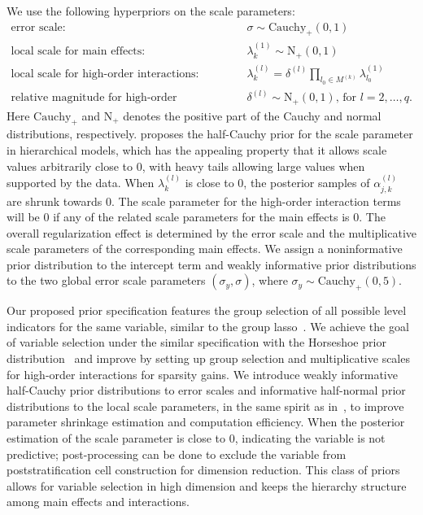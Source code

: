 \documentclass[11pt]{article}
\numberwithin{figure}{section}
\numberwithin{table}{section}
\numberwithin{equation}{section}
\begin{document}
We use the following hyperpriors on the scale parameters: \begin{align}
  \label{main} \nonumber  \mbox{error scale: }&\sigma \sim
  \textrm{Cauchy}_{+}(0,1) \\ \nonumber \mbox{local scale for main effects: } &
  \lambda_k^{(1)} \sim  \textrm{N}_{+}(0,1)\\ \mbox{local scale for high-order
  interactions: } & \lambda^{(l)}_k=\delta^{(l)}\prod_{l_0\in
  M^{(k)}}\lambda^{(1)}_{l_0} \\ \nonumber  \mbox{relative magnitude for
  high-order interactions: }&\delta^{(l)}  \sim   \textrm{N}_{+}(0,1) \mbox{,
  for } l=2,\dots, q.  \end{align} Here $\textrm{Cauchy}_{+}$ and
  $\textrm{N}_{+}$ denotes the positive part of the Cauchy and normal
  distributions, respectively.  \cite{gelman06-prior} proposes the half-Cauchy
  prior for the scale parameter in hierarchical models, which has the appealing
  property that it allows scale values arbitrarily close to 0, with heavy tails
  allowing large values when supported by the data. When $\lambda_k^{(l)}$ is
  close to 0, the posterior samples of $\alpha_{j,k}^{(l)}$ are shrunk towards
  0. The scale parameter for the high-order interaction terms will be 0 if any
  of the related scale parameters for the main effects is 0. The overall
  regularization effect is determined by the error scale and the multiplicative
  scale parameters of the corresponding main effects. We assign a
  noninformative prior distribution to the intercept term and weakly
  informative prior distributions to the two global error scale parameters
  $(\sigma_y, \sigma)$, where $\sigma_y\sim \textrm{Cauchy}_{+}(0,5)$.


Our proposed prior specification features the group selection of all possible
level indicators for the same variable, similar to the group
lasso~\citep{grouplasso06}. We achieve the goal of variable selection under the
similar specification with the Horseshoe prior distribution~\citep{horseshoe10}
and improve by setting up group selection and multiplicative scales for
high-order interactions for sparsity gains. We introduce weakly informative
half-Cauchy prior distributions to error scales and informative half-normal
prior distributions to the local scale parameters, in the same spirit as
in~\cite{hyperprior:Aki16}, to improve parameter shrinkage estimation and
computation efficiency. When the posterior estimation of the scale parameter is
close to 0, indicating the variable is not predictive; post-processing can be
done to exclude the variable from poststratification cell construction for
dimension reduction. This class of priors allows for variable selection in high
dimension and keeps the hierarchy structure among main effects and
interactions.
 
\end{document}
